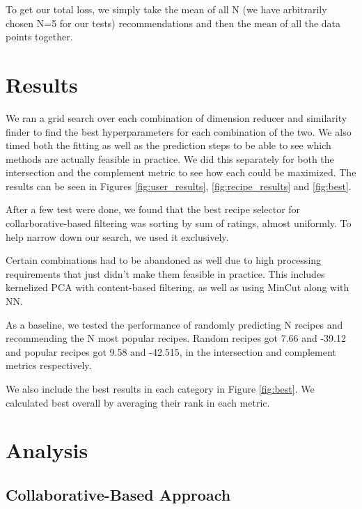 \documentclass[11pt]{article}
\begin{document}
To get our total loss, we simply take the mean of all N (we have arbitrarily chosen N=5 for our tests) recommendations and then the mean of all the data points together.


\section{Results}

We ran a grid search over each combination of dimension reducer and similarity finder to find the best hyperparameters for each combination of the two. We also timed both the fitting as well as the prediction steps to be able to see which methods are actually feasible in practice. We did this separately for both the intersection and the complement metric to see how each could be maximized. The results can be seen in Figures \ref{fig:user_results}, \ref{fig:recipe_results} and \ref{fig:best}.

After a few test were done, we found that the best recipe selector for collarborative-based filtering was sorting by sum of ratings, almost uniformly. To help narrow down our search, we used it exclusively. 

Certain combinations had to be abandoned as well due to high processing requirements that just didn't make them feasible in practice. This includes kernelized PCA with content-based filtering, as well as using MinCut along with NN. 

As a baseline, we tested the performance of randomly predicting N recipes and recommending the N most popular recipes. Random recipes got 7.66 and -39.12 and popular recipes got 9.58 and -42.515, in the intersection and complement metrics respectively.


We also include the best results in each category in Figure \ref{fig:best}. We calculated best overall by averaging their rank in each metric.

\section{Analysis}

\subsection{Collaborative-Based Approach}
\end{document}
